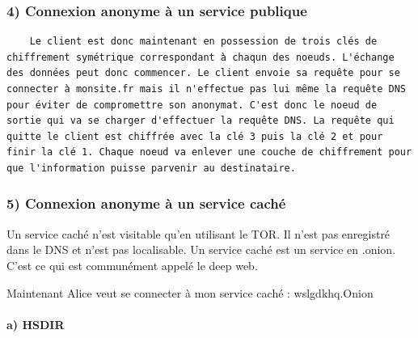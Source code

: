 \documentclass[]{article}
\let\oldparagraph\paragraph
\renewcommand{\paragraph}[1]{\oldparagraph{#1}\mbox{}}
\begin{document}
\subsubsection{4) Connexion anonyme à un service
publique}\label{connexion-anonyme-uxe0-un-service-publique}

\begin{verbatim}
    Le client est donc maintenant en possession de trois clés de chiffrement symétrique correspondant à chaqun des noeuds. L'échange des données peut donc commencer. Le client envoie sa requête pour se connecter à monsite.fr mais il n'effectue pas lui même la requête DNS pour éviter de compromettre son anonymat. C'est donc le noeud de sortie qui va se charger d'effectuer la requête DNS. La requête qui quitte le client est chiffrée avec la clé 3 puis la clé 2 et pour finir la clé 1. Chaque noeud va enlever une couche de chiffrement pour que l'information puisse parvenir au destinataire.
\end{verbatim}

\subsubsection{5) Connexion anonyme à un service
caché}\label{connexion-anonyme-uxe0-un-service-cachuxe9}

Un service caché n'est visitable qu'en utilisant le TOR. Il n'est pas
enregistré dans le DNS et n'est pas localisable. Un service caché est un
service en .onion. C'est ce qui est communément appelé le deep web.

Maintenant Alice veut se connecter à mon service caché : wslgdkhq.Onion

\paragraph{a) HSDIR}\label{a-hsdir}
\end{document}
